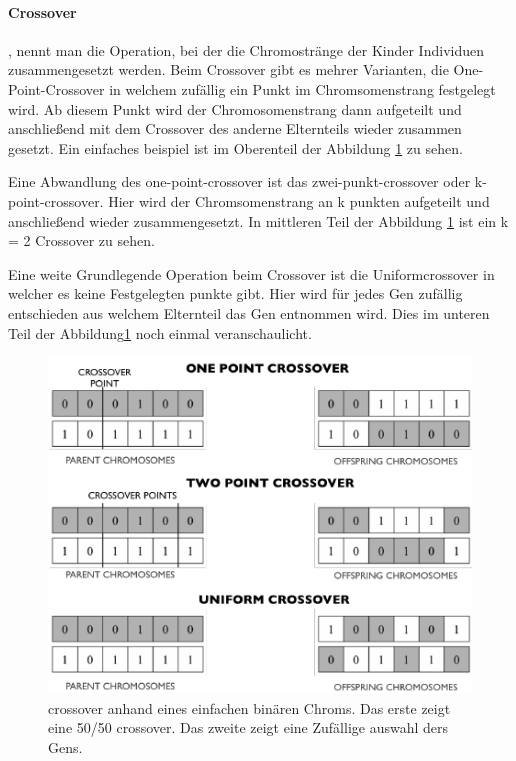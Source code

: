 \paragraph{Crossover}, nennt man die Operation, bei der die Chromostränge der Kinder Individuen zusammengesetzt werden.
Beim Crossover gibt es mehrer Varianten, die One-Point-Crossover in welchem zufällig ein Punkt im Chromsomenstrang festgelegt wird.
Ab diesem Punkt wird der Chromosomenstrang dann aufgeteilt und anschließend mit dem Crossover des anderne Elternteils wieder zusammen gesetzt. Ein einfaches beispiel ist im Oberenteil der Abbildung \ref{fig:chromoson_crossover} zu sehen.

Eine Abwandlung des one-point-crossover ist das zwei-punkt-crossover oder k-point-crossover. Hier wird der Chromsomenstrang an k punkten aufgeteilt und anschließend wieder zusammengesetzt.
In mittleren Teil der Abbildung \ref{fig:chromoson_crossover}
ist ein k = 2 Crossover zu sehen.

Eine weite Grundlegende Operation beim Crossover ist die Uniformcrossover \cite{Syswerda1989} in welcher es keine Festgelegten punkte gibt. Hier wird für jedes Gen zufällig entschieden aus welchem Elternteil das Gen entnommen wird.
Dies im unteren Teil der Abbildung\ref{fig:chromoson_crossover} noch einmal veranschaulicht.

\begin{figure}[H]
  \centering  
  \includegraphics[scale=0.5]{img/Cossover.png}
  \caption{crossover anhand eines einfachen binären Chroms. Das erste zeigt eine 50/50 crossover. Das zweite zeigt eine Zufällige auswahl ders Gens.\cite{Rashid2017} }
  \label{fig:chromoson_crossover}
\end{figure}

